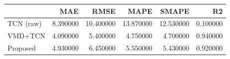 \begin{tabular}{lrrrrr}
\toprule
 & MAE & RMSE & MAPE & SMAPE & R2 \\
\midrule
TCN (raw) & 8.390000 & 10.400000 & 13.870000 & 12.530000 & 0.100000 \\
VMD+TCN & 4.090000 & 5.400000 & 4.750000 & 4.700000 & 0.940000 \\
Proposed & 4.930000 & 6.450000 & 5.550000 & 5.430000 & 0.920000 \\
\bottomrule
\end{tabular}

